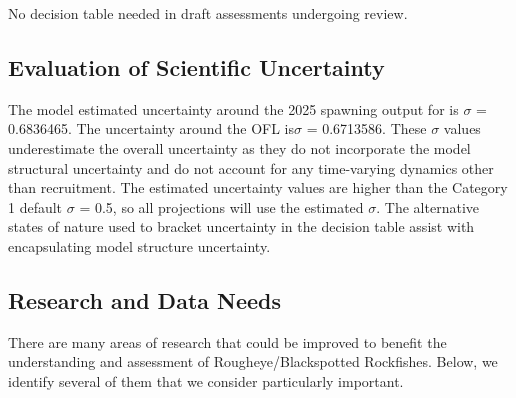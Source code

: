 \documentclass[
]{scrartcl}
\begin{document}
No decision table needed in draft assessments undergoing review.

\subsection{Evaluation of Scientific
Uncertainty}\label{evaluation-of-scientific-uncertainty}

The model estimated uncertainty around the 2025 spawning output for is
\(\sigma\) = 0.6836465. The uncertainty around the OFL is\(\sigma\) =
0.6713586. These \(\sigma\) values underestimate the overall uncertainty
as they do not incorporate the model structural uncertainty and do not
account for any time-varying dynamics other than recruitment. The
estimated uncertainty values are higher than the Category 1 default
\(\sigma\) = 0.5, so all projections will use the estimated \(\sigma\).
The alternative states of nature used to bracket uncertainty in the
decision table assist with encapsulating model structure uncertainty.

\subsection{Research and Data Needs}\label{research-and-data-needs-1}

There are many areas of research that could be improved to benefit the
understanding and assessment of Rougheye/Blackspotted Rockfishes. Below,
we identify several of them that we consider particularly important.
\end{document}
